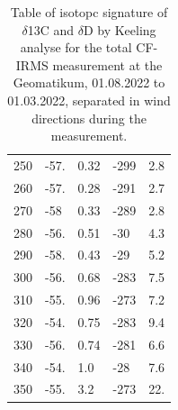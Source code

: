 \begin{table}[htbp]
\begin{tabular}{@{}lllll@{}}
250       & -57.       & 0.32     & -299      & 2.8     \\
260       & -57.       & 0.28     & -291      & 2.7     \\
270       & -58        & 0.33     & -289      & 2.8     \\
280       & -56.       & 0.51     & -30       & 4.3     \\
290       & -58.       & 0.43     & -29       & 5.2     \\
300       & -56.       & 0.68     & -283      & 7.5     \\
310       & -55.       & 0.96     & -273      & 7.2     \\
320       & -54.       & 0.75     & -283      & 9.4     \\
330       & -56.       & 0.74     & -281      & 6.6     \\
340       & -54.       & 1.0      & -28       & 7.6     \\
350       & -55.       & 3.2      & -273      & 22.     \\ \bottomrule
\end{tabular}
\label{WindKeelingTableTotalAppendix}
\caption[Windrose by DWD and Universität Hamburg]{Table of isotopc signature of $\delta$13C and $\delta$D by Keeling analyse for the total CF-IRMS measurement at the Geomatikum, 01.08.2022 to 01.03.2022, separated in wind directions during the measurement.}
\end{table}


